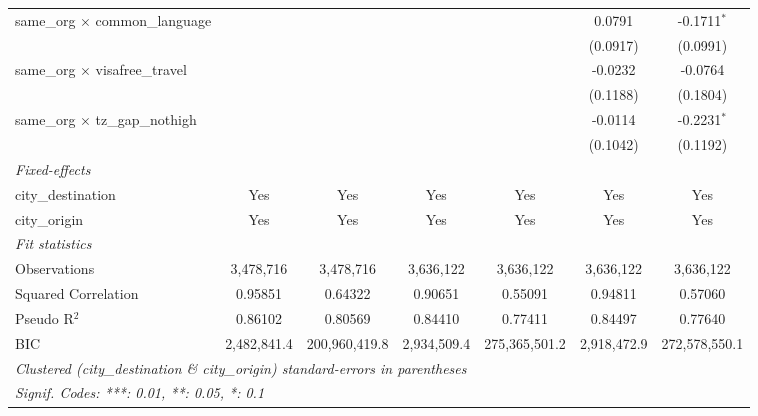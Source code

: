 \begin{tabular}{lcccccc}
   same\_org $\times$ common\_language                    &                 &                     &                &                     & 0.0791          & -0.1711$^{*}$\\   
                                                          &                 &                     &                &                     & (0.0917)        & (0.0991)\\   
   same\_org $\times$ visafree\_travel                    &                 &                     &                &                     & -0.0232         & -0.0764\\   
                                                          &                 &                     &                &                     & (0.1188)        & (0.1804)\\   
   same\_org $\times$ tz\_gap\_nothigh                    &                 &                     &                &                     & -0.0114         & -0.2231$^{*}$\\   
                                                          &                 &                     &                &                     & (0.1042)        & (0.1192)\\   
   \midrule
   \emph{Fixed-effects}\\
   city\_destination                                      & Yes             & Yes                 & Yes            & Yes                 & Yes             & Yes\\  
   city\_origin                                           & Yes             & Yes                 & Yes            & Yes                 & Yes             & Yes\\  
   \midrule
   \emph{Fit statistics}\\
   Observations                                           & 3,478,716       & 3,478,716           & 3,636,122      & 3,636,122           & 3,636,122       & 3,636,122\\  
   Squared Correlation                                    & 0.95851         & 0.64322             & 0.90651        & 0.55091             & 0.94811         & 0.57060\\  
   Pseudo R$^2$                                           & 0.86102         & 0.80569             & 0.84410        & 0.77411             & 0.84497         & 0.77640\\  
   BIC                                                    & 2,482,841.4     & 200,960,419.8       & 2,934,509.4    & 275,365,501.2       & 2,918,472.9     & 272,578,550.1\\  
   \midrule \midrule
   \multicolumn{7}{l}{\emph{Clustered (city\_destination \& city\_origin) standard-errors in parentheses}}\\
   \multicolumn{7}{l}{\emph{Signif. Codes: ***: 0.01, **: 0.05, *: 0.1}}\\
\end{tabular}
\par\endgroup


